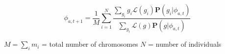 \documentclass[11pt]{a0poster}
\begin{document}
{\begin{minipage}[t][2045pt][t]{\linewidth}
\begin{minipage}{0.6\linewidth}
\begin{minipage}{0.47\linewidth}
{\begin{minipage}[t][795pt][t]{\linewidth}
\large $$ \phi_{a,t+1} = \frac{1}{M}\sum_{i=1}^N \frac{\sum_{g_i} g_i  \mathcal{L}(g_i)\mathbf{P}(g_i | \phi_{a,t}) }{ \sum_{g_i} \mathcal{L}(g)\mathbf{P}(g | \phi_{a,t})} $$
\begin{center}
$M = \sum_i m_i$ = total number of chromosomes $N$ = number of individuals
\end{center}
\pagebreak
\end{minipage}
}
\end{minipage}

\pagebreak
\end{minipage}
\end{minipage}
}
\end{document}
